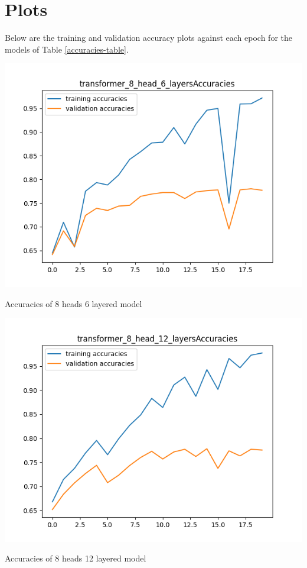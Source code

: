 \documentclass{article}
\begin{document}
\section{Plots}
\label{appendix:plots}
Below are the training and validation accuracy plots against each epoch for the models of Table \ref{accuracies-table}. \\
\begin{minipage}{0.49\textwidth}
 \centering
 \includegraphics[width=1\linewidth]{transformer_8_head_6_layers_Accuracies.png}
 \caption{Accuracies of 8 heads 6 layered model}
\end{minipage}\hfill
\begin{minipage}{0.49\textwidth}
 \centering
 \includegraphics[width=1\linewidth]{transformer_8_head_12_layers_Accuracies.png}
 \caption{Accuracies of 8 heads 12 layered model}
\end{minipage}\hfill
\end{document}
